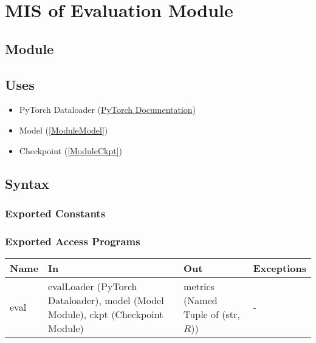 \documentclass[12pt, titlepage]{article}
\begin{document}
\newpage

\section{MIS of Evaluation Module} \label{ModuleEval} 

\subsection{Module}



\subsection{Uses}
\begin{itemize}
  \item PyTorch Dataloader (\href{https://pytorch.org/tutorials/beginner/basics/data_tutorial.html}{PyTorch Documentation})
  \item Model (\ref{ModuleModel})
  \item Checkpoint (\ref{ModuleCkpt})
\end{itemize}


\subsection{Syntax}



\subsubsection{Exported Constants}



\subsubsection{Exported Access Programs}

\begin{center}
  \begin{tabular}{p{2cm}|p{6cm}|p{2cm}|p{2cm}}
  \hline
  \textbf{Name} & \textbf{In} & \textbf{Out} & \textbf{Exceptions} \\
  \hline
  eval & evalLoader (PyTorch Dataloader), model (Model Module), ckpt (Checkpoint Module) & metrics (Named Tuple of (str, $R$)) & - \\
  \hline
  \end{tabular}
\end{center}
\end{document}
